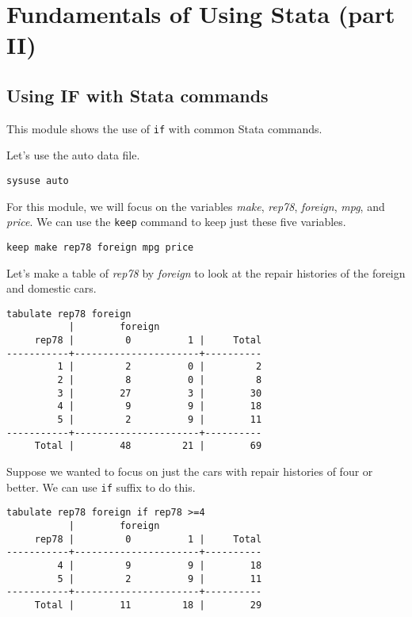 \section{Fundamentals of Using Stata (part II)}
\subsection{Using IF with Stata commands}

This module shows the use of \lstinline{if} with common Stata commands.

Let\rq{}s use the auto data file.
\begin{lstlisting}
sysuse auto
\end{lstlisting}

For this module, we will focus on the variables \textit{make}, \textit{rep78}, \textit{foreign}, \textit{mpg}, and \textit{price}. We can use the \lstinline{keep} command to keep just these five variables.

\begin{lstlisting}
keep make rep78 foreign mpg price
\end{lstlisting}

Let's make a table of \textit{rep78} by \textit{foreign} to look at the repair histories of the foreign and domestic cars.

\begin{lstlisting}
tabulate rep78 foreign
           |        foreign
     rep78 |         0          1 |     Total
-----------+----------------------+----------
         1 |         2          0 |         2
         2 |         8          0 |         8
         3 |        27          3 |        30
         4 |         9          9 |        18
         5 |         2          9 |        11
-----------+----------------------+----------
     Total |        48         21 |        69
\end{lstlisting}

Suppose we wanted to focus on just the cars with repair histories of four or better. We can use \lstinline{if} suffix to do this.

\begin{lstlisting}
tabulate rep78 foreign if rep78 >=4
           |        foreign
     rep78 |         0          1 |     Total
-----------+----------------------+----------
         4 |         9          9 |        18
         5 |         2          9 |        11
-----------+----------------------+----------
     Total |        11         18 |        29
\end{lstlisting}

